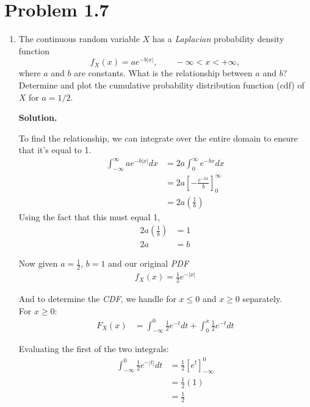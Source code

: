 \documentclass[11pt]{article}
\newenvironment{solution}{\par\noindent\textbf{Solution.}\ }{\par\vspace{6pt}}
\begin{document}
    \newpage
    \section*{Problem 1.7}

    \begin{enumerate}[label=(\alph*)]

    \item The continuous random variable $X$ has a \emph{Laplacian} probability density function
    \[
        f_X(x) = a e^{-b|x|}, \qquad -\infty < x < +\infty,
    \]
    where $a$ and $b$ are constants. What is the relationship between $a$ and $b$? Determine and plot the cumulative probability distribution function (cdf) of $X$ for $a = 1/2$.

    \begin{solution}

        To find the relationship, we can integrate over the entire domain to ensure that it's equal to 1.
        \begin{align}
            \int_{-\infty}^{\infty} a e^{-b|x|} dx &= 2a\int_{0}^{\infty} e^{-bx} dx \\
            &= 2a \left[-\frac{e^{-bx}}{b}\right]_{0}^{\infty} \\
            &= 2a \left(\frac{1}{b}\right)
        \end{align}
        Using the fact that this must equal 1,
        \begin{align}
            2a \left(\frac{1}{b}\right) &= 1 \\
            2a &= b
        \end{align}

        Now given $a = \frac{1}{2}$, $b = 1$ and our original \emph{PDF}
        \begin{align}
            f_X(x) = \frac{1}{2} e^{-|x|}
        \end{align}

        And to determine the \emph{CDF}, we handle for $x \le 0$ and $x \geq 0$ separately. \\
        For $x \geq 0$:
        \begin{align}
            F_X(x) &= \int_{-\infty}^{0} \frac{1}{2} e^{-t} dt + \int_{0}^{x} \frac{1}{2} e^{-t} dt
        \end{align}

        Evaluating the first of the two integrals:
        \begin{align}
            \int_{-\infty}^{0} \frac{1}{2} e^{-|t|} dt &= \frac{1}{2} \left[e^{t}\right]_{-\infty}^{0} \\
            &= \frac{1}{2} (1) \\
            &= \frac{1}{2}
        \end{align}


\end{solution}
\end{enumerate}
\end{document}
